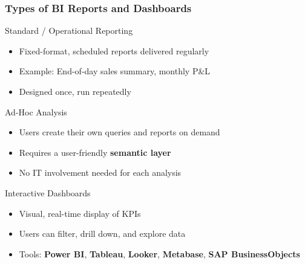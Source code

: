 \begin{frame}
  \frametitle{Types of BI Reports and Dashboards}

  \begin{block}{Standard / Operational Reporting}
    \begin{itemize}
      \item Fixed-format, scheduled reports delivered regularly
      \item Example: End-of-day sales summary, monthly P\&L
      \item Designed once, run repeatedly
    \end{itemize}
  \end{block}

  \begin{block}{Ad-Hoc Analysis}
    \begin{itemize}
      \item Users create their own queries and reports on demand
      \item Requires a user-friendly \textbf{semantic layer}
      \item No IT involvement needed for each analysis
    \end{itemize}
  \end{block}

  \begin{block}{Interactive Dashboards}
    \begin{itemize}
      \item Visual, real-time display of KPIs
      \item Users can filter, drill down, and explore data
      \item Tools: \textbf{Power BI}, \textbf{Tableau}, \textbf{Looker},
        \textbf{Metabase}, \textbf{SAP BusinessObjects}
    \end{itemize}
  \end{block}
\end{frame}


